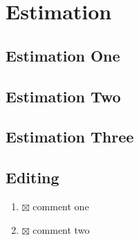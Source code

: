 \section{Estimation}

\subsection{Estimation One}


\subsection{Estimation Two}


\subsection{Estimation Three}


\subsection{Editing}
\begin{enumerate}
  \item $\boxtimes$ comment one
  \item $\boxtimes$ comment two
\end{enumerate}
